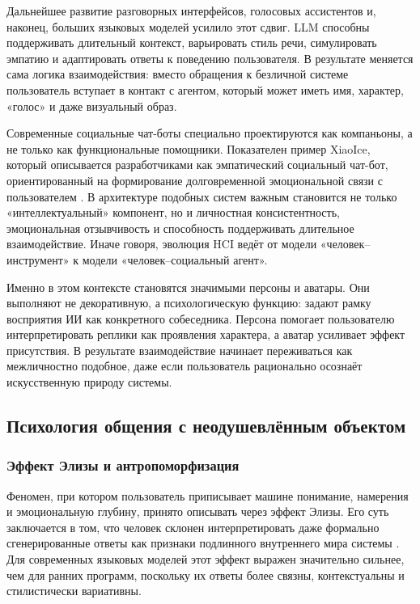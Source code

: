 \documentclass[areasetadvanced]{scrartcl}
\begin{document}
Дальнейшее развитие разговорных интерфейсов, голосовых ассистентов и,
наконец, больших языковых моделей усилило этот сдвиг. LLM способны
поддерживать длительный контекст, варьировать стиль речи, симулировать
эмпатию и адаптировать ответы к поведению пользователя. В результате
меняется сама логика взаимодействия: вместо обращения к безличной
системе пользователь вступает в контакт с агентом, который может иметь
имя, характер, «голос» и даже визуальный образ.

Современные социальные чат-боты специально проектируются как
компаньоны, а не только как функциональные помощники. Показателен
пример XiaoIce, который описывается разработчиками как эмпатический
социальный чат-бот, ориентированный на формирование долговременной
эмоциональной связи с пользователем \cite{Zhou2020XiaoIce}. В
архитектуре подобных систем важным становится не только
«интеллектуальный» компонент, но и личностная консистентность,
эмоциональная отзывчивость и способность поддерживать длительное
взаимодействие. Иначе говоря, эволюция HCI ведёт от модели
«человек--инструмент» к модели «человек--социальный агент».

Именно в этом контексте становятся значимыми персоны и аватары. Они
выполняют не декоративную, а психологическую функцию: задают рамку
восприятия ИИ как конкретного собеседника. Персона помогает
пользователю интерпретировать реплики как проявления характера, а
аватар усиливает эффект присутствия. В результате взаимодействие
начинает переживаться как межличностно подобное, даже если
пользователь рационально осознаёт искусственную природу системы.

\subsection{Психология общения с неодушевлённым объектом}

\subsubsection{Эффект Элизы и антропоморфизация}

Феномен, при котором пользователь приписывает машине понимание,
намерения и эмоциональную глубину, принято описывать через эффект
Элизы. Его суть заключается в том, что человек склонен
интерпретировать даже формально сгенерированные ответы как признаки
подлинного внутреннего мира системы \cite{Weizenbaum1966}. Для
современных языковых моделей этот эффект выражен значительно сильнее,
чем для ранних программ, поскольку их ответы более связны,
контекстуальны и стилистически вариативны.
\end{document}
